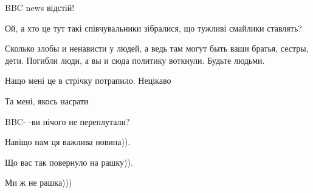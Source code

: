 \begin{itemize}
BBC news відстій!

 
Ой, а хто це тут такі співчувальники зібралися, що тужливі смайлики ставлять?

 

Сколько злобы и ненависти у людей, а ведь там могут быть ваши братья,
сестры, дети. Погибли люди, а вы и сюда политику воткнули. Будьте людьми.


 
Нащо мені це в стрічку потрапило. Нецікаво

 
Та мені, якось насрати

 
BBC- -ви нічого не переплутали?


 

Навіщо нам ця важлива новина)).

Що вас так повернуло на рашку)).

Ми ж не рашка)))


\end{itemize}
